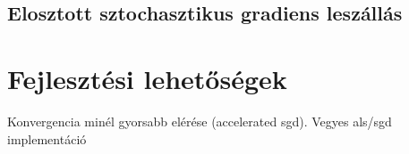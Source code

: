 \documentclass[a4paper,12pt]{article}
\begin{document}
\subsection{Elosztott sztochasztikus gradiens leszállás}

\section{Fejlesztési lehetőségek}

Konvergencia minél gyorsabb elérése (accelerated sgd). 
Vegyes als/sgd implementáció


\newpage

\printbibliography
\end{document}
